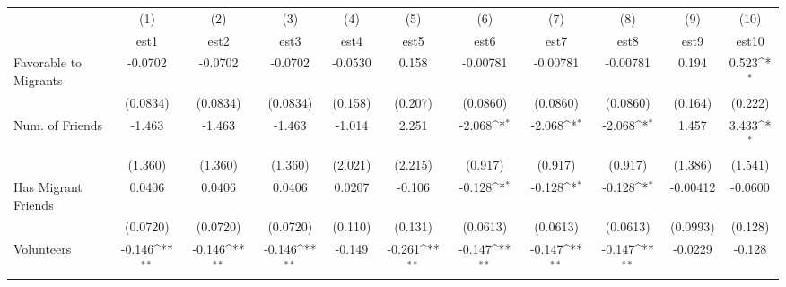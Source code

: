 {
\def\sym#1{\ifmmode^{#1}\else\(^{#1}\)\fi}
\begin{tabular}{l*{10}{c}}
\toprule
            &\multicolumn{1}{c}{(1)}&\multicolumn{1}{c}{(2)}&\multicolumn{1}{c}{(3)}&\multicolumn{1}{c}{(4)}&\multicolumn{1}{c}{(5)}&\multicolumn{1}{c}{(6)}&\multicolumn{1}{c}{(7)}&\multicolumn{1}{c}{(8)}&\multicolumn{1}{c}{(9)}&\multicolumn{1}{c}{(10)}\\
            &\multicolumn{1}{c}{est1}&\multicolumn{1}{c}{est2}&\multicolumn{1}{c}{est3}&\multicolumn{1}{c}{est4}&\multicolumn{1}{c}{est5}&\multicolumn{1}{c}{est6}&\multicolumn{1}{c}{est7}&\multicolumn{1}{c}{est8}&\multicolumn{1}{c}{est9}&\multicolumn{1}{c}{est10}\\
\midrule
Favorable to Migrants&     -0.0702         &     -0.0702         &     -0.0702         &     -0.0530         &       0.158         &    -0.00781         &    -0.00781         &    -0.00781         &       0.194         &       0.523\sym{*}  \\
            &    (0.0834)         &    (0.0834)         &    (0.0834)         &     (0.158)         &     (0.207)         &    (0.0860)         &    (0.0860)         &    (0.0860)         &     (0.164)         &     (0.222)         \\
\addlinespace
Num. of Friends&      -1.463         &      -1.463         &      -1.463         &      -1.014         &       2.251         &      -2.068\sym{*}  &      -2.068\sym{*}  &      -2.068\sym{*}  &       1.457         &       3.433\sym{*}  \\
            &     (1.360)         &     (1.360)         &     (1.360)         &     (2.021)         &     (2.215)         &     (0.917)         &     (0.917)         &     (0.917)         &     (1.386)         &     (1.541)         \\
\addlinespace
Has Migrant Friends&      0.0406         &      0.0406         &      0.0406         &      0.0207         &      -0.106         &      -0.128\sym{*}  &      -0.128\sym{*}  &      -0.128\sym{*}  &    -0.00412         &     -0.0600         \\
            &    (0.0720)         &    (0.0720)         &    (0.0720)         &     (0.110)         &     (0.131)         &    (0.0613)         &    (0.0613)         &    (0.0613)         &    (0.0993)         &     (0.128)         \\
\addlinespace
Volunteers  &      -0.146\sym{**} &      -0.146\sym{**} &      -0.146\sym{**} &      -0.149         &      -0.261\sym{**} &      -0.147\sym{**} &      -0.147\sym{**} &      -0.147\sym{**} &     -0.0229         &      -0.128         \\

\end{tabular}}
